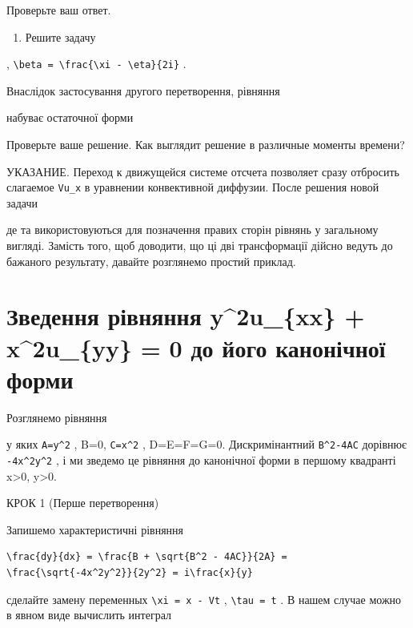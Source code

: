 \documentclass[
  ukrainian,
]{article}
\providecommand{\tightlist}{%
  \setlength{\itemsep}{0pt}\setlength{\parskip}{0pt}}
\begin{document}
Проверьте ваш ответ.

\begin{enumerate}
\def\labelenumi{\arabic{enumi}.}
\setcounter{enumi}{3}
\tightlist
\item
  Решите задачу
\end{enumerate}

,
\texttt{\textbackslash{}beta\ =\ \textbackslash{}frac\{\textbackslash{}xi\ -\ \textbackslash{}eta\}\{2i\}}
.

Внаслідок застосування другого перетворення, рівняння

набуває остаточної форми

Проверьте ваше решение. Как выглядит решение в различные моменты
времени?

УКАЗАНИЕ. Переход к движущейся системе отсчета позволяет сразу отбросить
слагаемое \texttt{Vu\_x} в уравнении конвективной диффузии. После
решения новой задачи

де \phi та \phi використовуються для позначення правих сторін рівнянь у
загальному вигляді. Замість того, щоб доводити, що ці дві трансформації
дійсно ведуть до бажаного результату, давайте розглянемо простий
приклад.

\section{Зведення рівняння y\^{}2u\_\{xx\} + x\^{}2u\_\{yy\} = 0 до його
канонічної
форми}\label{ux437ux432ux435ux434ux435ux43dux43dux44f-ux440ux456ux432ux43dux44fux43dux43dux44f-y2u_xx-x2u_yy-0-ux434ux43e-ux439ux43eux433ux43e-ux43aux430ux43dux43eux43dux456ux447ux43dux43eux457-ux444ux43eux440ux43cux438}

Розглянемо рівняння

у яких \texttt{A=y\^{}2} , B=0, \texttt{C=x\^{}2} , D=E=F=G=0.
Дискримінантний \texttt{B\^{}2-4AC} дорівнює \texttt{-4x\^{}2y\^{}2} , і
ми зведемо це рівняння до канонічної форми в першому квадранті
x\textgreater0, y\textgreater0.

КРОК 1 (Перше перетворення)

Запишемо характеристичні рівняння

\begin{verbatim}
\frac{dy}{dx} = \frac{B + \sqrt{B^2 - 4AC}}{2A} = \frac{\sqrt{-4x^2y^2}}{2y^2} = i\frac{x}{y}
\end{verbatim}

сделайте замену переменных \texttt{\textbackslash{}xi\ =\ x\ -\ Vt} ,
\texttt{\textbackslash{}tau\ =\ t} . В нашем случае можно в явном виде
вычислить интеграл
\end{document}
